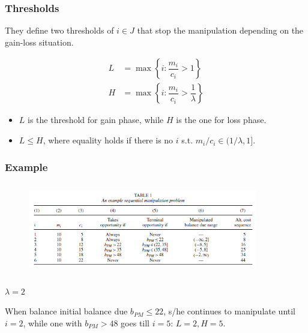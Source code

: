 \documentclass[dvipdfmx,12pt]{beamer}
\begin{document}
\begin{frame}\frametitle{Thresholds}
  They define two thresholds of $i \in J$ that stop the manipulation depending
  on the gain-loss situation.

  \begin{align*}
    L &= \max \left \{ i: \dfrac{m_i}{c_i} > 1 \right \} \\
    H &= \max \left \{ i: \dfrac{m_i}{c_i} > \dfrac{1}{\lambda} \right \}
  \end{align*}

  \begin{itemize}
    \item $L$ is the threshold for gain phase, while $H$ is the
     one for loss phase.

     \item $L \leq H$, where equality holds if there is no $i$ s.t.
     $m_i/c_i \in (1/\lambda , 1]$.
  \end{itemize}
\end{frame}
\begin{frame}\frametitle{Example}
  \begin{figure}
    \includegraphics[width = 10cm, height = 4cm]{fig_tab/ARJ_T1.png}
  \end{figure}
  \begin{center}
    $\lambda = 2$
  \end{center}

  When balance initial balance due $b_{PM} \leq 22$, s/he continues
  to manipulate until $i=2$, while one with $b_{PM} > 48$ goes till
  $i = 5$:
  $L = 2, H = 5$.
\end{frame}
\end{document}
